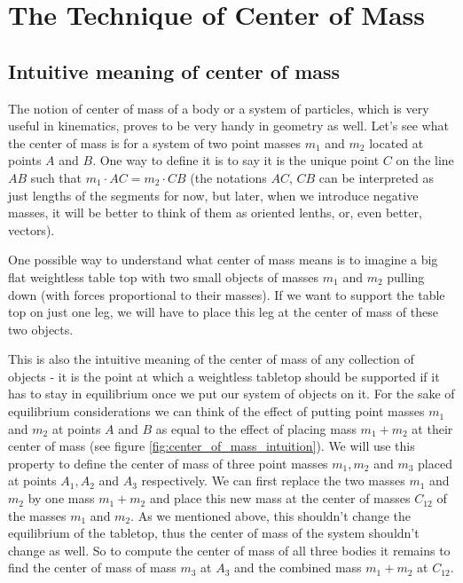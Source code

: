 \chapter{The Technique of Center of Mass}
\section{Intuitive meaning of center of mass}
The notion of center of mass of a body or a system of particles, which is very useful in kinematics, proves to be very handy in geometry as well.
Let's see what the center of mass is for a system of two point masses $m_1$ and $m_2$ located at points $A$ and $B$. One way to define it is to say it is the unique point $C$ on the line $AB$ such that $m_1\cdot AC=m_2\cdot CB$ (the notations $AC$, $CB$ can be interpreted as just lengths of the segments for now, but later, when we introduce negative masses, it will be better to think of them as oriented lenths, or, even better, vectors).

One possible way to understand what center of mass means is to imagine a big flat weightless table top with two small objects of masses $m_1$ and $m_2$ pulling down (with forces proportional to their masses). If we want to support the table top on just one leg, we will have to place this leg at the center of mass of these two objects.

This is also the intuitive meaning of the center of mass of any collection of objects - it is the point at which a weightless tabletop should be supported if it has to stay in equilibrium once we put our system of objects on it.
For the sake of equilibrium considerations we can think of the effect of putting point masses $m_1$ and $m_2$ at points $A$ and $B$ as equal to the effect of placing mass $m_1+m_2$ at their center of mass (see figure \ref{fig:center_of_mass_intuition}).
We will use this property to define the center of mass of three point masses $m_1,m_2$ and $m_3$ placed at points $A_1,A_2$ and $A_3$ respectively. We can first replace the two masses $m_1$ and $m_2$ by one mass $m_1+m_2$ and place this new mass at the center of masses $C_{12}$ of the masses $m_1$ and $m_2$. As we mentioned above, this shouldn't change the equilibrium of the tabletop, thus the center of mass of the system shouldn't change as well. So to compute the center of mass of all three bodies it remains to find the center of mass of mass $m_3$ at $A_3$ and the combined mass $m_1+m_2$ at $C_{12}$.
